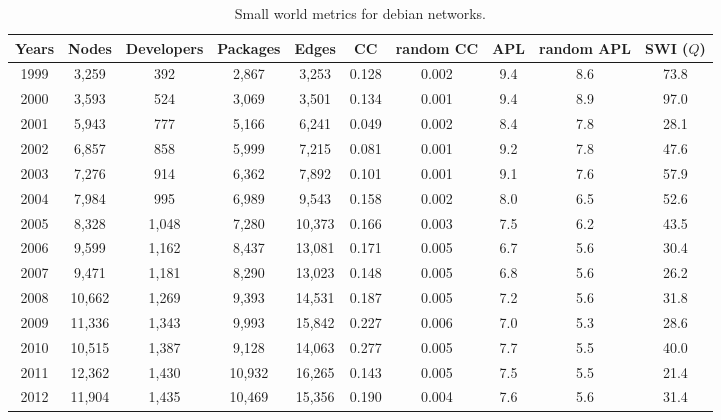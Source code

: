 \begin{table}[H]
\begin{center}
\begin{small}
\begin{tabular}{|c|c|c|c|c|c|c|c|c|c|}
\hline
Years&Nodes&Developers&Packages&Edges&CC&random CC&APL&random APL&SWI ($Q$)\\
\hline
1999&3,259&392&2,867&3,253&0.128&0.002&9.4&8.6&73.8\\
2000&3,593&524&3,069&3,501&0.134&0.001&9.4&8.9&97.0\\
2001&5,943&777&5,166&6,241&0.049&0.002&8.4&7.8&28.1\\
2002&6,857&858&5,999&7,215&0.081&0.001&9.2&7.8&47.6\\
2003&7,276&914&6,362&7,892&0.101&0.001&9.1&7.6&57.9\\
2004&7,984&995&6,989&9,543&0.158&0.002&8.0&6.5&52.6\\
2005&8,328&1,048&7,280&10,373&0.166&0.003&7.5&6.2&43.5\\
2006&9,599&1,162&8,437&13,081&0.171&0.005&6.7&5.6&30.4\\
2007&9,471&1,181&8,290&13,023&0.148&0.005&6.8&5.6&26.2\\
2008&10,662&1,269&9,393&14,531&0.187&0.005&7.2&5.6&31.8\\
2009&11,336&1,343&9,993&15,842&0.227&0.006&7.0&5.3&28.6\\
2010&10,515&1,387&9,128&14,063&0.277&0.005&7.7&5.5&40.0\\
2011&12,362&1,430&10,932&16,265&0.143&0.005&7.5&5.5&21.4\\
2012&11,904&1,435&10,469&15,356&0.190&0.004&7.6&5.6&31.4\\
\hline
\end{tabular}
\caption{Small world metrics for debian networks.}
\label{swi_debian}
\end{small}
\end{center}
\end{table}

